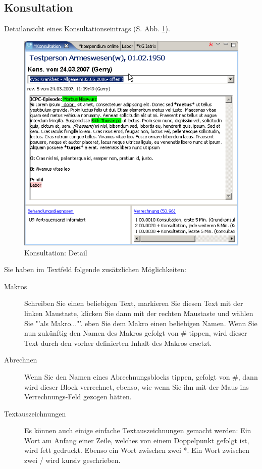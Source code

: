 \subsection{Konsultation}
 \label{konsview}
Detailansicht eines Konsultationseintrags (S. Abb. \ref{fig:konsdetail}).
\begin{figure}[ht]
  \includegraphics{images/konsview}
  \caption{Konsultation: Detail}
  \label{fig:konsdetail}
\end{figure}

Sie haben im Textfeld folgende zusätzlichen Möglichkeiten:
\begin{description}
\item[Makros]
Schreiben Sie einen beliebigen Text, markieren Sie diesen Text mit der linken Maustaste, klicken Sie dann mit der rechten Maustaste und wählen Sie "'als Makro..."'. eben Sie dem Makro einen beliebigen Namen. Wenn Sie nun zukünftig den Namen des Makros gefolgt von \# tippen, wird dieser Text durch den vorher definierten Inhalt des Makros ersetzt.

\item[Abrechnen]
Wenn Sie den Namen eines Abrechnungsblocks tippen, gefolgt von \#, dann wird dieser Block verrechnet, ebenso, wie wenn Sie ihn mit der Maus ins Verrechnungs-Feld gezogen hätten.

\item[Textauszeichnungen]
Es können auch einige einfache Textauszeichnungen gemacht werden: Ein Wort am Anfang einer Zeile, welches von einem Doppelpunkt gefolgt ist, wird fett gedruckt. Ebenso ein Wort zwischen zwei *. Ein Wort zwischen zwei / wird kursiv geschrieben.
\end{description}


